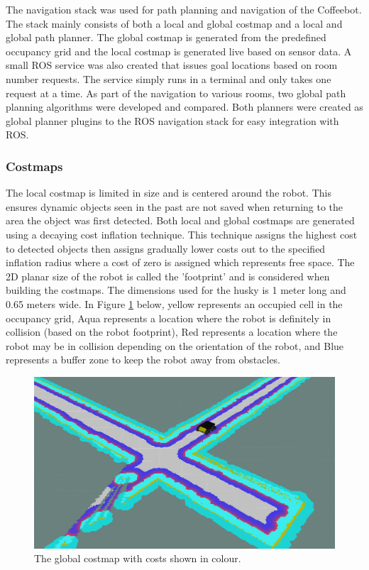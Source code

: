 \documentclass[letterpaper, 10 pt, conference]{ieeeconf}  %
\begin{document}
The navigation stack was used for path planning and navigation of the Coffeebot. The stack mainly consists of both a local and global costmap and a local and global path planner. The global costmap is generated from the predefined occupancy grid and the local costmap is generated live based on sensor data. A small ROS service was also created that issues goal locations based on room number requests. The service simply runs in a terminal and only takes one request at a time. As part of the navigation to various rooms, two global path planning algorithms were developed and compared. Both planners were created as global planner plugins to the ROS navigation stack for easy integration with ROS.

\subsubsection{Costmaps}

The local costmap is limited in size and is centered around the robot. This ensures dynamic objects seen in the past are not saved when returning to the area the object was first detected. Both local and global costmaps are generated using a decaying cost inflation technique. This technique assigns the highest cost to detected objects then assigns gradually lower costs out to the specified inflation radius where a cost of zero is assigned which represents free space. The 2D planar size of the robot is called the 'footprint' and is considered when building the costmaps. The dimensions used for the husky is 1 meter long and 0.65 meters wide. In Figure \ref{global_costmap} below, yellow represents an occupied cell in the occupancy grid, Aqua represents a location where the robot is definitely in collision (based on the robot footprint), Red represents a location where the robot may be in collision depending on the orientation of the robot, and Blue represents a buffer zone to keep the robot away from obstacles.

	\begin{figure}[!ht]
		\centering
		\includegraphics[width=1.0\columnwidth]{Figures/global_costmap}
		\caption{The global costmap with costs shown in colour.}
		\label{global_costmap}
	\end{figure}
\end{document}
